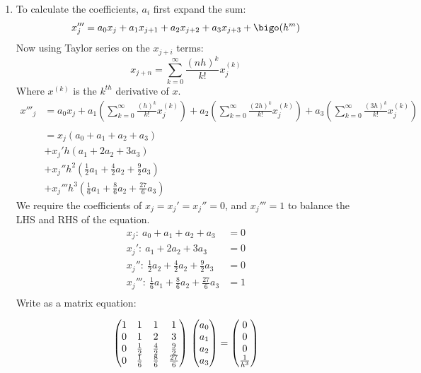 \documentclass{X:/Documents/Coding/Latex/myassignment}
\begin{document}
\begin{enumerate}
	\begin{enumerate}
		\item %
		To calculate the coefficients, $a_i$ first expand the sum:
		\[x'''_j = a_0x_j + a_1 x_{j+1} + a_2x_{j+2} + a_3 x_{j+3} + \bigo(h^m)\]
		Now using Taylor series on the $x_{j+i}$ terms:
		\[x_{j+n} = \sum_{k=0}^\infty \frac{(nh)^k}{k!} x_j^{(k)} \]
		Where $x^{(k)}$ is the $k^{th}$ derivative of $x$.
		\begin{align*}
			x'''_j &= a_0 x_j + a_1 \left(\sum_{k=0}^\infty \frac{(h)^k}{k!} x_j^{(k)}\right) + a_2 \left(\sum_{k=0}^\infty \frac{(2h)^k}{k!} x_j^{(k)}\right) + a_3\left(\sum_{k=0}^\infty \frac{(3h)^k}{k!} x_j^{(k)} \right)\\\\
			&=x_j\left(a_0 + a_1 + a_2 + a_3\right) 
			\\&+ x_{j}' h\left(a_1 + 2a_2 + 3a_3\right) 
			\\&+ x_{j}'' h^2\left(\frac{1}{2}a_1 + \frac{4}{2}a_2 + \frac{9}{2}a_3\right)
			\\&+ x_{j}''' h^3\left(\frac{1}{6}a_1 + \frac{8}{6}a_2 + \frac{27}{6}a_3\right)
		\end{align*}
		We require the coefficients of $x_j = x_j'=x_j'' = 0$, and $x_j''' = 1$ to balance the LHS and RHS of the equation.
		\begin{align*}
			x_j:   \ a_0 + a_1 + a_2 + a_3 &= 0\\
			x_j':  \ a_1 + 2a_2 +3a_3 &= 0\\
			x_j'': \ \frac12 a_2 + \frac42a_2 + \frac92 a_3&=0\\
			x_j''':\ \frac16 a_1 + \frac{8}{6} a_2 + \frac{27}{6} a_3&=1\\
		\end{align*}
		Write as a matrix equation:

		\[
		\begin{pmatrix}
			1&1&1&1\\
			0&1&2&3\\
			0&\frac12&\frac42&\frac92\\
			0&\frac16&\frac86&\frac{27}6
		\end{pmatrix}\\
		\begin{pmatrix}
			a_0\\a_1\\a_2\\a_3
		\end{pmatrix} = \begin{pmatrix}
			0\\0\\0\\\frac{1}{h^3}
		\end{pmatrix}
		\]	
		

\end{enumerate}
\end{enumerate}
\end{document}
